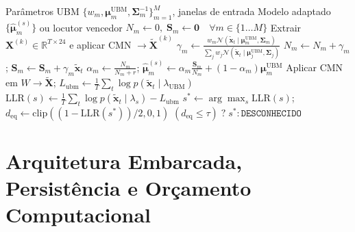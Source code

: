 \documentclass[9pt,technote,a4paper]{IEEEtran}
\begin{document}
\begin{algorithm}[t]
\caption{Adaptação MAP Incremental e Inferência GMM-UBM}
\label{alg:gmm_ubm}
\begin{algorithmic}[1]
\Require Parâmetros UBM $\{w_m, \boldsymbol{\mu}_m^{\mathrm{UBM}}, \boldsymbol{\Sigma}_m^{-1}\}_{m=1}^M$, janelas de entrada
\Ensure Modelo adaptado $\{\hat{\boldsymbol{\mu}}_m^{(s)}\}$ ou locutor vencedor
    \State $N_m \leftarrow 0,\; \mathbf{S}_m \leftarrow \mathbf{0} \quad \forall m \in \{1\dots M\}$
        \State Extrair $\mathbf{X}^{(k)} \in \mathbb{R}^{T\times 24}$ e aplicar CMN $\rightarrow \tilde{\mathbf{X}}^{(k)}$
            \State $\gamma_m \leftarrow \frac{w_m \mathcal{N}(\tilde{\mathbf{x}}_t \mid \boldsymbol{\mu}_m^{\mathrm{UBM}}, \boldsymbol{\Sigma}_m)}{\sum_j w_j \mathcal{N}(\tilde{\mathbf{x}}_t \mid \boldsymbol{\mu}_j^{\mathrm{UBM}}, \boldsymbol{\Sigma}_j)}$
            \State $N_m \leftarrow N_m + \gamma_m$; \quad $\mathbf{S}_m \leftarrow \mathbf{S}_m + \gamma_m \tilde{\mathbf{x}}_t$
        \EndFor
    \EndFor
    \State $\alpha_m \leftarrow \frac{N_m}{N_m + r}$; \quad $\hat{\boldsymbol{\mu}}_m^{(s)} \leftarrow \alpha_m \frac{\mathbf{S}_m}{N_m} + (1 - \alpha_m)\boldsymbol{\mu}_m^{\mathrm{UBM}}$
\EndProcedure
{}
    \State Aplicar CMN em $W \rightarrow \tilde{\mathbf{X}}$; \quad $L_{\mathrm{ubm}} \leftarrow \frac{1}{T}\sum_t \log p(\tilde{\mathbf{x}}_t \mid \lambda_{\mathrm{UBM}})$
        \State $\mathrm{LLR}(s) \leftarrow \frac{1}{T}\sum_t \log p(\tilde{\mathbf{x}}_t \mid \lambda_s) - L_{\mathrm{ubm}}$
    \EndFor
    \State $s^* \leftarrow \arg\max_s \mathrm{LLR}(s)$; \quad $d_{\mathrm{eq}} \leftarrow \mathrm{clip}((1-\mathrm{LLR}(s^*))/2, 0, 1)$
    \State \Return $(d_{\mathrm{eq}} \le \tau)\; ?\; s^* : \texttt{DESCONHECIDO}$
\EndProcedure
\end{algorithmic}
\end{algorithm}

\section{Arquitetura Embarcada, Persistência e Orçamento Computacional}
\label{sec:firmware}
\end{document}
